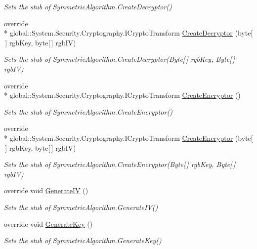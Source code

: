 \begin{DoxyCompactItemize}
\begin{DoxyCompactList}\small\item\em Sets the stub of Symmetric\-Algorithm.\-Create\-Decryptor()\end{DoxyCompactList}\item 
override \\*
global\-::\-System.\-Security.\-Cryptography.\-I\-Crypto\-Transform \hyperlink{class_system_1_1_security_1_1_cryptography_1_1_fakes_1_1_stub_symmetric_algorithm_acd790983901773d2f2cc0ac1fd189a75}{Create\-Decryptor} (byte\mbox{[}$\,$\mbox{]} rgb\-Key, byte\mbox{[}$\,$\mbox{]} rgb\-I\-V)
\begin{DoxyCompactList}\small\item\em Sets the stub of Symmetric\-Algorithm.\-Create\-Decryptor(\-Byte\mbox{[}$\,$\mbox{]} rgb\-Key, Byte\mbox{[}$\,$\mbox{]} rgb\-I\-V)\end{DoxyCompactList}\item 
override \\*
global\-::\-System.\-Security.\-Cryptography.\-I\-Crypto\-Transform \hyperlink{class_system_1_1_security_1_1_cryptography_1_1_fakes_1_1_stub_symmetric_algorithm_a93ede41769a349f81898a9c567f8077a}{Create\-Encryptor} ()
\begin{DoxyCompactList}\small\item\em Sets the stub of Symmetric\-Algorithm.\-Create\-Encryptor()\end{DoxyCompactList}\item 
override \\*
global\-::\-System.\-Security.\-Cryptography.\-I\-Crypto\-Transform \hyperlink{class_system_1_1_security_1_1_cryptography_1_1_fakes_1_1_stub_symmetric_algorithm_a45954494f1f4ebda45966dc057725683}{Create\-Encryptor} (byte\mbox{[}$\,$\mbox{]} rgb\-Key, byte\mbox{[}$\,$\mbox{]} rgb\-I\-V)
\begin{DoxyCompactList}\small\item\em Sets the stub of Symmetric\-Algorithm.\-Create\-Encryptor(\-Byte\mbox{[}$\,$\mbox{]} rgb\-Key, Byte\mbox{[}$\,$\mbox{]} rgb\-I\-V)\end{DoxyCompactList}\item 
override void \hyperlink{class_system_1_1_security_1_1_cryptography_1_1_fakes_1_1_stub_symmetric_algorithm_a1bd093ad39ca6d16fcf959f6f5c8d0a1}{Generate\-I\-V} ()
\begin{DoxyCompactList}\small\item\em Sets the stub of Symmetric\-Algorithm.\-Generate\-I\-V()\end{DoxyCompactList}\item 
override void \hyperlink{class_system_1_1_security_1_1_cryptography_1_1_fakes_1_1_stub_symmetric_algorithm_a8050f7e2b072b95ad109a037fae50e2a}{Generate\-Key} ()
\begin{DoxyCompactList}\small\item\em Sets the stub of Symmetric\-Algorithm.\-Generate\-Key()\end{DoxyCompactList}\end{DoxyCompactItemize}
